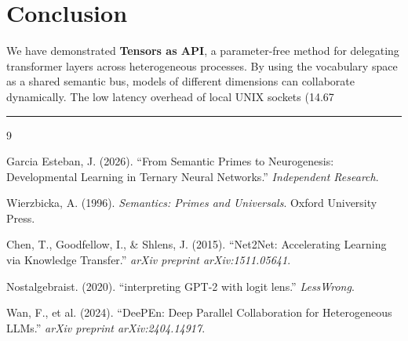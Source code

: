 \documentclass{article}
\begin{document}
\section{Conclusion}

We have demonstrated \textbf{Tensors as API}, a parameter-free method for delegating transformer layers across heterogeneous processes. By using the vocabulary space as a shared semantic bus, models of different dimensions can collaborate dynamically. The low latency overhead of local UNIX sockets (14.67%

\hrule

\begin{thebibliography}{9}

Garcia Esteban, J. (2026).
\newblock ``From Semantic Primes to Neurogenesis: Developmental Learning in Ternary Neural Networks.''
\newblock \textit{Independent Research}.

Wierzbicka, A. (1996).
\newblock \textit{Semantics: Primes and Universals}.
\newblock Oxford University Press.

Chen, T., Goodfellow, I., \& Shlens, J. (2015).
\newblock ``Net2Net: Accelerating Learning via Knowledge Transfer.''
\newblock \textit{arXiv preprint arXiv:1511.05641}.

Nostalgebraist. (2020).
\newblock ``interpreting GPT-2 with logit lens.''
\newblock \textit{LessWrong}.

Wan, F., et al. (2024).
\newblock ``DeePEn: Deep Parallel Collaboration for Heterogeneous LLMs.''
\newblock \textit{arXiv preprint arXiv:2404.14917}.

\end{thebibliography}
\end{document}
